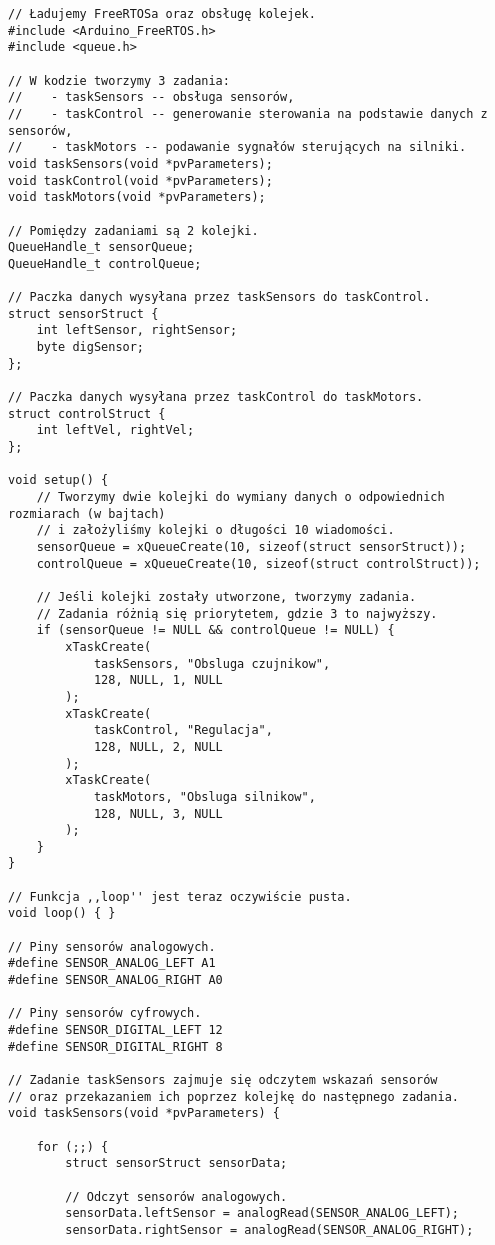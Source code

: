\documentclass[11pt]{article}
\begin{document}
\begin{appendices}
\begin{lstlisting}[basicstyle = \ttfamily \footnotesize]
// Ładujemy FreeRTOSa oraz obsługę kolejek.
#include <Arduino_FreeRTOS.h>
#include <queue.h>

// W kodzie tworzymy 3 zadania:
//    - taskSensors -- obsługa sensorów,
//    - taskControl -- generowanie sterowania na podstawie danych z sensorów,
//    - taskMotors -- podawanie sygnałów sterujących na silniki.
void taskSensors(void *pvParameters);
void taskControl(void *pvParameters);
void taskMotors(void *pvParameters);

// Pomiędzy zadaniami są 2 kolejki.
QueueHandle_t sensorQueue;
QueueHandle_t controlQueue;

// Paczka danych wysyłana przez taskSensors do taskControl.
struct sensorStruct {
    int leftSensor, rightSensor;
    byte digSensor;
};

// Paczka danych wysyłana przez taskControl do taskMotors.
struct controlStruct {
    int leftVel, rightVel;
};

void setup() {
    // Tworzymy dwie kolejki do wymiany danych o odpowiednich rozmiarach (w bajtach)
    // i założyliśmy kolejki o długości 10 wiadomości.
    sensorQueue = xQueueCreate(10, sizeof(struct sensorStruct));
    controlQueue = xQueueCreate(10, sizeof(struct controlStruct));

    // Jeśli kolejki zostały utworzone, tworzymy zadania.
    // Zadania różnią się priorytetem, gdzie 3 to najwyższy.
    if (sensorQueue != NULL && controlQueue != NULL) {
        xTaskCreate(
            taskSensors, "Obsluga czujnikow",
            128, NULL, 1, NULL
        );
        xTaskCreate(
            taskControl, "Regulacja",
            128, NULL, 2, NULL
        );
        xTaskCreate(
            taskMotors, "Obsluga silnikow",
            128, NULL, 3, NULL
        );        
    }
}

// Funkcja ,,loop'' jest teraz oczywiście pusta.
void loop() { }

// Piny sensorów analogowych.
#define SENSOR_ANALOG_LEFT A1
#define SENSOR_ANALOG_RIGHT A0

// Piny sensorów cyfrowych.
#define SENSOR_DIGITAL_LEFT 12
#define SENSOR_DIGITAL_RIGHT 8

// Zadanie taskSensors zajmuje się odczytem wskazań sensorów
// oraz przekazaniem ich poprzez kolejkę do następnego zadania.
void taskSensors(void *pvParameters) {

    for (;;) {
        struct sensorStruct sensorData;

        // Odczyt sensorów analogowych.
        sensorData.leftSensor = analogRead(SENSOR_ANALOG_LEFT);
        sensorData.rightSensor = analogRead(SENSOR_ANALOG_RIGHT);


\end{lstlisting}
\end{appendices}
\end{document}
